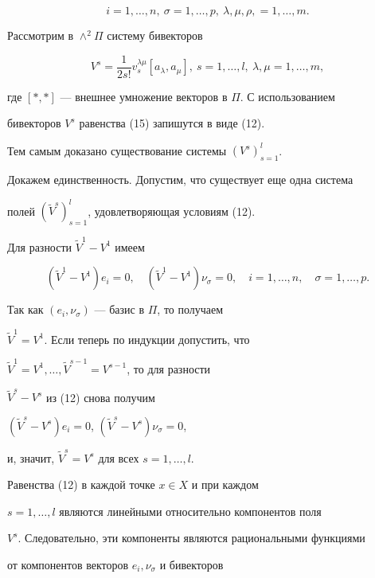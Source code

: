 $$


i=1,\dotsc,n,\ \sigma=1,\dotsc,p,\ \lambda,\mu,\rho,=1,\dotsc,m .


$$


Рассмотрим в $\wedge^2\Pi$ систему бивекторов


$$


V^s=\frac{1}{2s!}v^{\lambda\mu}_s[a_{\lambda},a_{\mu}], \


s=1,\dotsc,l,\ \lambda,\mu=1,\dotsc,m,


$$


где $[*,*]$ --- внешнее умножение векторов в $\Pi$. С использованием


бивекторов $V^s$ равенства (15) запишутся в виде (12).


Тем самым доказано существование системы $(V^s)_{s=1}^l$.





Докажем единственность. Допустим, что существует еще одна система


полей $(\widetilde V^s)_{s=1}^l$, удовлетворяющая условиям (12).


Для разности $\widetilde V^1-V^1$ имеем


$$


(\widetilde V^1-V^1)e_i=0,\quad (\tilde V^1-V^1)\nu_{\sigma}=0,\quad


i=1,\dotsc,n, \quad


\sigma=1,\dotsc,p.


$$


Так как $(e_i,\nu_{\sigma})$ --- базис в $\Pi$, то получаем


$\widetilde V^1= V^1$. Если теперь по индукции допустить, что


$\widetilde V^1= V^1,\dotsc,\widetilde V^{s-1}= V^{s-1}$, то для разности


$\widetilde V^s- V^s$ из (12) снова получим


$(\widetilde V^s- V^s)e_i= 0$, $(\widetilde V^s- V^s)\nu_{\sigma}= 0$,


и, значит, $\widetilde V^s= V^s$ для всех $s= 1,\dotsc,l$.





Равенства (12) в каждой точке $x\in X$ и при каждом


$s= 1,\dotsc,l$ являются линейными относительно компонентов поля


$V^s$. Следовательно, эти компоненты являются рациональными функциями


от компонентов векторов $e_i,\nu_{\sigma}$ и бивекторов


